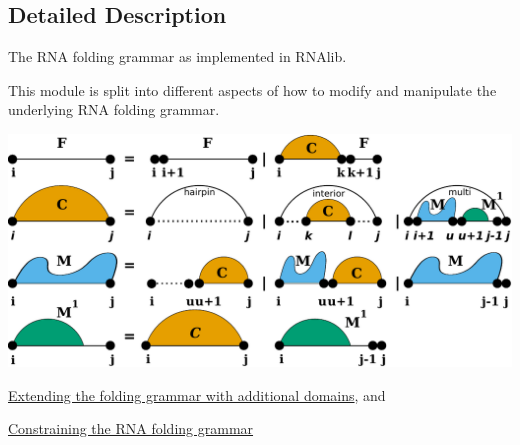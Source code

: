 \subsection{Detailed Description}
The R\+NA folding grammar as implemented in R\+N\+Alib. 

This module is split into different aspects of how to modify and manipulate the underlying R\+NA folding grammar.

 
\begin{DoxyImageNoCaption}
  \mbox{\includegraphics[width=\textwidth,height=\textheight/2,keepaspectratio=true]{recursions}}
\end{DoxyImageNoCaption}



\begin{DoxyItemize}
\item \hyperlink{group__domains}{Extending the folding grammar with additional domains}, and
\item \hyperlink{group__constraints}{Constraining the R\+NA folding grammar} 
\end{DoxyItemize}